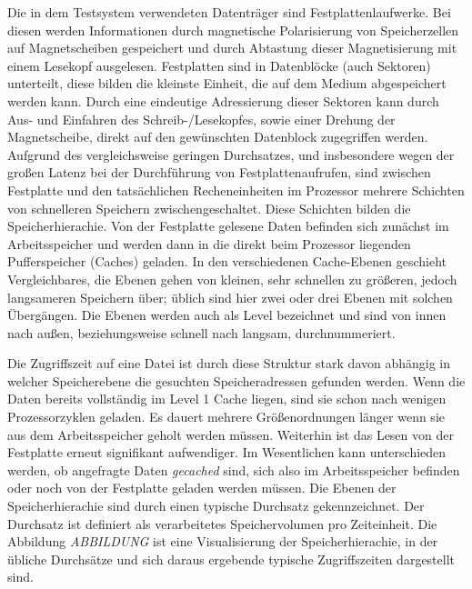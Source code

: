 \documentclass[
	12pt,
	a4paper,
	BCOR10mm,
	DIV14,
	listof=totoc,
	bibliography=totoc,
	headsepline
]{scrreprt}
\begin{document}
Die in dem Testsystem verwendeten Datenträger sind Festplattenlaufwerke. Bei diesen werden Informationen durch magnetische Polarisierung von Speicherzellen auf Magnetscheiben gespeichert und durch Abtastung dieser Magnetisierung mit einem Lesekopf ausgelesen.
Festplatten sind in Datenblöcke (auch Sektoren) unterteilt, diese bilden die kleinste Einheit, die auf dem Medium abgespeichert werden kann. Durch eine eindeutige Adressierung dieser Sektoren kann durch Aus- und Einfahren des Schreib-/Lesekopfes, sowie einer Drehung der Magnetscheibe, direkt auf den gewünschten Datenblock zugegriffen werden.
Aufgrund des vergleichsweise geringen Durchsatzes, und insbesondere wegen der großen Latenz bei der Durchführung von Festplattenaufrufen, sind zwischen Festplatte und den tatsächlichen Recheneinheiten im Prozessor mehrere Schichten von schnelleren Speichern zwischengeschaltet. Diese Schichten bilden die Speicherhierachie.
Von der Festplatte gelesene Daten befinden sich zunächst im Arbeitsspeicher und werden dann in die direkt beim Prozessor liegenden Pufferspeicher (Caches) geladen.
In den verschiedenen Cache-Ebenen geschieht Vergleichbares, die Ebenen gehen von kleinen, sehr schnellen zu größeren, jedoch langsameren Speichern über; üblich sind hier zwei oder drei Ebenen mit solchen Übergängen. Die Ebenen werden auch als Level bezeichnet und sind von innen nach außen, beziehungsweise schnell nach langsam, durchnummeriert. 
\medskip

Die Zugriffszeit auf eine Datei ist durch diese Struktur stark davon abhängig in welcher Speicherebene die gesuchten Speicheradressen gefunden werden. Wenn die Daten bereits vollständig im Level 1 Cache liegen, sind sie schon nach wenigen Prozessorzyklen geladen. Es dauert mehrere Größenordnungen länger wenn sie aus dem Arbeitsspeicher geholt werden müssen. Weiterhin ist das Lesen von der Festplatte erneut signifikant aufwendiger. Im Wesentlichen kann unterschieden werden, ob angefragte Daten \textit{gecached} sind, sich also im Arbeitsspeicher befinden oder noch von der Festplatte geladen werden müssen.
Die Ebenen der Speicherhierachie sind durch einen typische Durchsatz gekennzeichnet. Der Durchsatz ist definiert als verarbeitetes Speichervolumen pro Zeiteinheit. Die Abbildung \textit{ABBILDUNG} ist eine Visualisierung der Speicherhierachie, in der übliche Durchsätze und sich daraus ergebende typische Zugriffszeiten dargestellt sind.
\medskip
\end{document}
